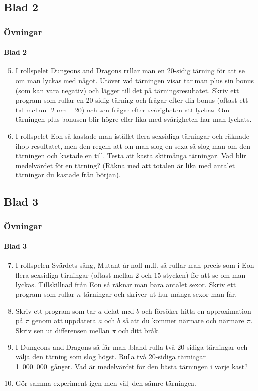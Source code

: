\documentclass[aspectratio=169]{beamer}
\begin{document}
\subsection{Blad 2}

\begin{frame}
	\frametitle{Övningar}
	\framesubtitle{Blad 2}
	
	\begin{enumerate}%
		\setcounter{enumi}{4}
		\item I rollspelet Dungeons and Dragons rullar man en 20-sidig tärning för att se om man lyckas med något. Utöver vad tärningen visar tar man plus sin bonus (som kan vara negativ) och lägger till det på tärningsresultatet. Skriv ett program som rullar en 20-sidig tärning och frågar efter din bonus (oftast ett tal mellan -2 och +20) och sen frågar efter svårigheten att lyckas. Om tärningen plus bonusen blir högre eller lika med svårigheten har man lyckats.
		\item I rollspelet Eon så kastade man istället flera sexsidiga tärningar och räknade ihop resultatet, men den regeln att om man slog en sexa så slog man om den tärningen och kastade en till. Testa att kasta skitmånga tärningar. Vad blir medelvärdet för en tärning? (Räkna med att totalen är lika med antalet tärningar du kastade från början).
	\end{enumerate}
		
\end{frame}

\subsection{Blad 3}

\begin{frame}
	\frametitle{Övningar}
	\framesubtitle{Blad 3}
	
	\begin{enumerate}
		\setcounter{enumi}{6}
		\item I rollspelen Svärdets sång, Mutant år noll m.fl. så rullar man precis som i Eon flera sexsidiga tärningar (oftast mellan 2 och 15 stycken) för att se om man lyckas. Tillskillnad från Eon så räknar man bara antalet sexor. Skriv ett program som rullar \(n\) tärningar och skriver ut hur många sexor man får.
		\item Skriv ett program som tar \(a\) delat med \(b\) och försöker hitta en approximation på \(\pi\) genom att uppdatera \(a\) och \(b\) så att du kommer närmare och närmare \(\pi\). Skriv sen ut differensen mellan \(\pi\) och ditt bråk.
		\item I Dungeons and Dragons så får man ibland rulla två 20-sidiga tärningar och välja den tärning som slog högst. Rulla två 20-sidiga tärningar 1~000~000~gånger. Vad är medelvärdet för den bästa tärningen i varje kast?
		\item Gör samma experiment igen men välj den sämre tärningen.
	\end{enumerate}


\end{frame}
\end{document}
